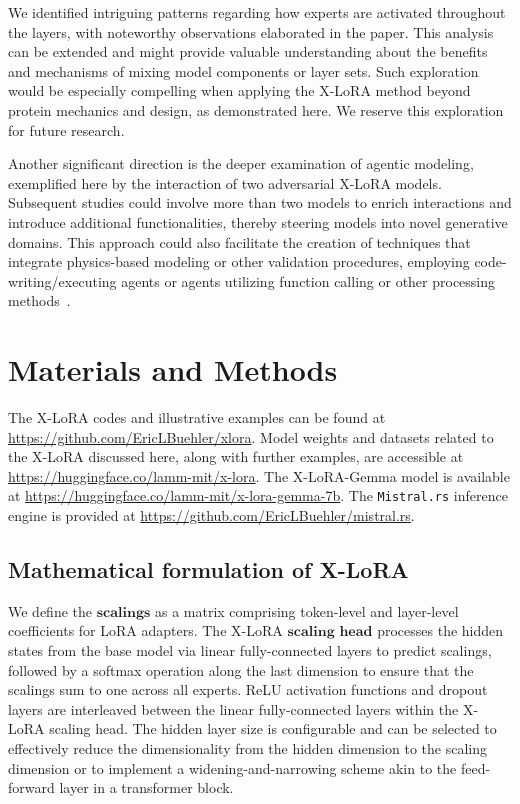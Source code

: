 We identified intriguing patterns regarding how experts are activated throughout the layers, with noteworthy observations elaborated in the paper. This analysis can be extended and might provide valuable understanding about the benefits and mechanisms of mixing model components or layer sets. Such exploration would be especially compelling when applying the X-LoRA method beyond protein mechanics and design, as demonstrated here. We reserve this exploration for future research.

Another significant direction is the deeper examination of agentic modeling, exemplified here by the interaction of two adversarial X-LoRA models. Subsequent studies could involve more than two models to enrich interactions and introduce additional functionalities, thereby steering models into novel generative domains. This approach could also facilitate the creation of techniques that integrate physics-based modeling or other validation procedures, employing code-writing/executing agents or agents utilizing function calling or other processing methods~\cite{Ghafarollahi2024ProtAgents:Learning}.

\section{Materials and Methods}

The X-LoRA codes and illustrative examples can be found at \url{https://github.com/EricLBuehler/xlora}. Model weights and datasets related to the X-LoRA discussed here, along with further examples, are accessible at \url{https://huggingface.co/lamm-mit/x-lora}. The X-LoRA-Gemma model is available at \url{https://huggingface.co/lamm-mit/x-lora-gemma-7b}. The \texttt{Mistral.rs} inference engine is provided at \url{https://github.com/EricLBuehler/mistral.rs}.

\subsection{Mathematical formulation of X-LoRA} We define the $\mathbf{scalings}$ as a matrix comprising token-level and layer-level coefficients for LoRA adapters. The X-LoRA $\mathbf{scaling}$ $\mathbf{head}$ processes the hidden states from the base model via linear fully-connected layers to predict scalings, followed by a softmax operation along the last dimension to ensure that the scalings sum to one across all experts. ReLU activation functions and dropout layers are interleaved between the linear fully-connected layers within the X-LoRA scaling head. The hidden layer size is configurable and can be selected to effectively reduce the dimensionality from the hidden dimension to the scaling dimension or to implement a widening-and-narrowing scheme akin to the feed-forward layer in a transformer block.


